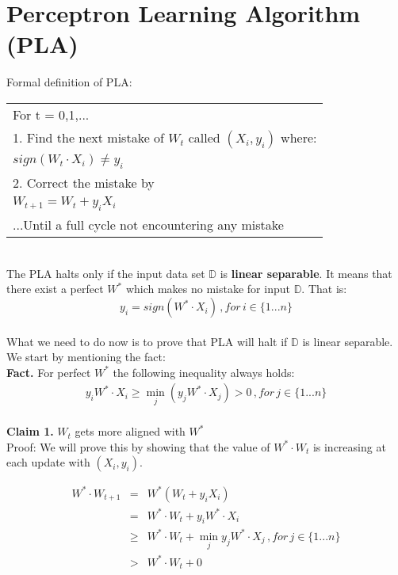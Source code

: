 \documentclass[11pt]{article}
\begin{document}
\section{Perceptron Learning Algorithm (PLA)}
Formal definition of PLA:\\

\begin{tabular}{|l|}
\hline
For t = 0,1,...\\

1. Find the next mistake of $\displaystyle{W_{t}}$ called $\displaystyle{(X_{i}, y_{i})}$ where:\\
[3mm]
\indent \indent $\displaystyle{sign\left( W_{t} \cdot X_{i} \right) \neq y_{i}}$\\
[3mm]
2. Correct the mistake by\\
[3mm]
\indent \indent $\displaystyle{W_{t+1} = W_t + y_{i}X_{i}}$\\
[3mm]
...Until a full cycle not encountering any mistake\\
\hline
\end{tabular}\\

The PLA halts only if the input data set $\mathbb{D}$ is \textbf{linear separable}. It means that there exist a perfect \textbf{$W^*$} which makes no mistake for input $\mathbb{D}$. That is:
$$y_i = sign \left( W^* \cdot X_i \right) \, ,for \,i \in \{1...n\}$$ 
\\
What we need to do now is to prove that PLA will halt if $\mathbb{D}$ is linear separable. We start by mentioning the fact:
\\
\textbf{Fact.} For perfect $W^*$ the following inequality always holds:\\
\begin{eqnarray}
y_{i}W^* \cdot X_{i} \geq \min _j\left(y_jW^* \cdot X_j\right) > 0 \, ,for \,j \in \{1...n\}
\end{eqnarray}
\\
\textbf{Claim 1.} $W_t$ gets more aligned with $W^*$\\
Proof: We will prove this by showing that the value of $W^* \cdot W_t$ is increasing at each update with $(X_i , y_i)$.

\begin{eqnarray}
W^* \cdot W_{t+1} &=& W^*(W_t+y_iX_i)\\
&=& W^*\cdot W_t+ y_i W^* \cdot X_i\\
&\geq& W^* \cdot W_t + \min _j y_j W^* \cdot X_j \, ,for \,j \in \{1...n\}\\
&>& W^* \cdot W_t + 0
\end{eqnarray}
\end{document}

